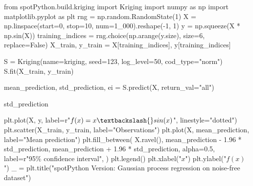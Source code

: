 \documentclass[
  letterpaper,
  DIV=11,
  numbers=noendperiod]{scrreprt}
\newenvironment{Shaded}{\begin{snugshade}}{\end{snugshade}}
\newcommand{\DecValTok}[1]{\textcolor[rgb]{0.68,0.00,0.00}{#1}}
\newcommand{\FloatTok}[1]{\textcolor[rgb]{0.68,0.00,0.00}{#1}}
\newcommand{\ImportTok}[1]{\textcolor[rgb]{0.00,0.46,0.62}{#1}}
\newcommand{\NormalTok}[1]{\textcolor[rgb]{0.00,0.23,0.31}{#1}}
\newcommand{\OperatorTok}[1]{\textcolor[rgb]{0.37,0.37,0.37}{#1}}
\newcommand{\SpecialCharTok}[1]{\textcolor[rgb]{0.37,0.37,0.37}{#1}}
\newcommand{\StringTok}[1]{\textcolor[rgb]{0.13,0.47,0.30}{#1}}
\newcommand{\VariableTok}[1]{\textcolor[rgb]{0.07,0.07,0.07}{#1}}
\newcommand{\VerbatimStringTok}[1]{\textcolor[rgb]{0.13,0.47,0.30}{#1}}
\begin{document}
\begin{Shaded}
\begin{Highlighting}[]
\ImportTok{from}\NormalTok{ spotPython.build.kriging }\ImportTok{import}\NormalTok{ Kriging}
\ImportTok{import}\NormalTok{ numpy }\ImportTok{as}\NormalTok{ np}
\ImportTok{import}\NormalTok{ matplotlib.pyplot }\ImportTok{as}\NormalTok{ plt}
\NormalTok{rng }\OperatorTok{=}\NormalTok{ np.random.RandomState(}\DecValTok{1}\NormalTok{)}
\NormalTok{X }\OperatorTok{=}\NormalTok{ np.linspace(start}\OperatorTok{=}\DecValTok{0}\NormalTok{, stop}\OperatorTok{=}\DecValTok{10}\NormalTok{, num}\OperatorTok{=}\DecValTok{1\_000}\NormalTok{).reshape(}\OperatorTok{{-}}\DecValTok{1}\NormalTok{, }\DecValTok{1}\NormalTok{)}
\NormalTok{y }\OperatorTok{=}\NormalTok{ np.squeeze(X }\OperatorTok{*}\NormalTok{ np.sin(X))}
\NormalTok{training\_indices }\OperatorTok{=}\NormalTok{ rng.choice(np.arange(y.size), size}\OperatorTok{=}\DecValTok{6}\NormalTok{, replace}\OperatorTok{=}\VariableTok{False}\NormalTok{)}
\NormalTok{X\_train, y\_train }\OperatorTok{=}\NormalTok{ X[training\_indices], y[training\_indices]}


\NormalTok{S }\OperatorTok{=}\NormalTok{ Kriging(name}\OperatorTok{=}\StringTok{\textquotesingle{}kriging\textquotesingle{}}\NormalTok{,  seed}\OperatorTok{=}\DecValTok{123}\NormalTok{, log\_level}\OperatorTok{=}\DecValTok{50}\NormalTok{, cod\_type}\OperatorTok{=}\StringTok{"norm"}\NormalTok{)}
\NormalTok{S.fit(X\_train, y\_train)}

\NormalTok{mean\_prediction, std\_prediction, ei }\OperatorTok{=}\NormalTok{ S.predict(X, return\_val}\OperatorTok{=}\StringTok{"all"}\NormalTok{)}

\NormalTok{std\_prediction}

\NormalTok{plt.plot(X, y, label}\OperatorTok{=}\VerbatimStringTok{r"$f(x) = x \textbackslash{}sin(x)$"}\NormalTok{, linestyle}\OperatorTok{=}\StringTok{"dotted"}\NormalTok{)}
\NormalTok{plt.scatter(X\_train, y\_train, label}\OperatorTok{=}\StringTok{"Observations"}\NormalTok{)}
\NormalTok{plt.plot(X, mean\_prediction, label}\OperatorTok{=}\StringTok{"Mean prediction"}\NormalTok{)}
\NormalTok{plt.fill\_between(}
\NormalTok{    X.ravel(),}
\NormalTok{    mean\_prediction }\OperatorTok{{-}} \FloatTok{1.96} \OperatorTok{*}\NormalTok{ std\_prediction,}
\NormalTok{    mean\_prediction }\OperatorTok{+} \FloatTok{1.96} \OperatorTok{*}\NormalTok{ std\_prediction,}
\NormalTok{    alpha}\OperatorTok{=}\FloatTok{0.5}\NormalTok{,}
\NormalTok{    label}\OperatorTok{=}\VerbatimStringTok{r"95}\SpecialCharTok{\% c}\VerbatimStringTok{onfidence interval"}\NormalTok{,}
\NormalTok{)}
\NormalTok{plt.legend()}
\NormalTok{plt.xlabel(}\StringTok{"$x$"}\NormalTok{)}
\NormalTok{plt.ylabel(}\StringTok{"$f(x)$"}\NormalTok{)}
\NormalTok{\_ }\OperatorTok{=}\NormalTok{ plt.title(}\StringTok{"spotPython Version: Gaussian process regression on noise{-}free dataset"}\NormalTok{)}
\end{Highlighting}
\end{Shaded}
\end{document}
